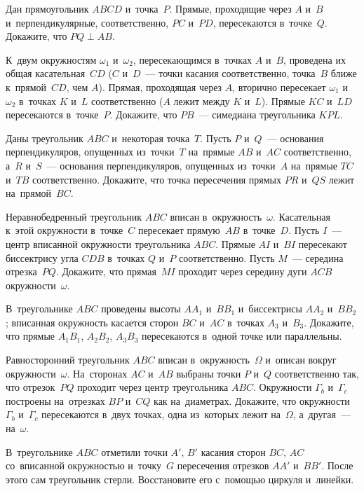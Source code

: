 


\begin{problems}

\item
Дан прямоугольник $ABCD$ и~точка~$P$.
Прямые, проходящие через $A$ и~$B$ и~перпендикулярные, соответственно,
$PC$ и~$PD$, пересекаются в~точке~$Q$.
Докажите, что $PQ \perp AB$.

\item
К~двум окружностям $\omega_{1}$ и~$\omega_{2}$, пересекающимся
в~точках $A$ и~$B$, проведена их общая касательная~$CD$ ($C$ и~$D$~--- точки
касания соответственно, точка~$B$ ближе к~прямой~$CD$, чем $A$).
Прямая, проходящая через $A$, вторично пересекает $\omega_{1}$ и~$\omega_{2}$
в~точках $K$ и~$L$ соответственно ($A$ лежит между $K$ и~$L$).
Прямые $KC$ и~$LD$ пересекаются в~точке~$P$.
Докажите, что $PB$~--- симедиана треугольника $KPL$.

\item
Даны треугольник $ABC$ и~некоторая точка~$T$.
Пусть $P$ и~$Q$~--- основания перпендикуляров, опущенных из~точки~$T$
на~прямые $AB$ и~$AC$ соответственно, а~$R$ и~$S$~--- основания
перпендикуляров, опущенных из~точки~$A$ на~прямые $TC$ и~$TB$ соответственно.
Докажите, что точка пересечения прямых $PR$ и~$QS$ лежит на~прямой~$BC$.

\item
Неравнобедренный треугольник $ABC$ вписан в~окружность~$\omega$.
Касательная к~этой окружности в~точке~$C$ пересекает прямую~$AB$ в~точке~$D$.
Пусть $I$~--- центр вписанной окружности треугольника $ABC$.
Прямые $AI$ и~$BI$ пересекают биссектрису угла $CDB$ в~точках $Q$ и~$P$
соответственно.
Пусть $M$~--- середина отрезка~$PQ$.
Докажите, что прямая~$MI$ проходит через середину дуги $ACB$
окружности~$\omega$.

\item
В~треугольнике $ABC$ проведены высоты $AA_{1}$ и~$BB_{1}$
и~биссектрисы $AA_{2}$ и~$BB_{2}$;
вписанная окружность касается сторон $BC$ и~$AC$ в~точках $A_{3}$ и~$B_{3}$.
Докажите, что прямые $A_{1}B_{1}$, $A_{2}B_{2}$, $A_{3}B_{3}$ пересекаются
в~одной точке или параллельны.

\item
Равносторонний треугольник $ABC$ вписан в~окружность~$\Omega$ и~описан вокруг
окружности~$\omega$.
На~сторонах $AC$ и~$AB$ выбраны точки $P$ и~$Q$ соответственно так, что
отрезок~$PQ$ проходит через центр треугольника $ABC$.
Окружности $\Gamma_{b}$ и~$\Gamma_{c}$ построены на~отрезках $BP$ и~$CQ$ как
на~диаметрах.
Докажите, что окружности $\Gamma_{b}$ и~$\Gamma_{c}$ пересекаются в~двух точках,
одна из~которых лежит на~$\Omega$, а~другая~--- на~$\omega$.

\item
В~треугольнике $ABC$ отметили точки $A'$, $B'$ касания сторон $BC$, $AC$
со~вписанной окружностью и~точку~$G$ пересечения отрезков $AA'$ и~$BB'$.
После этого сам треугольник стерли.
Восстановите его с~помощью циркуля и~линейки.

\end{problems}


